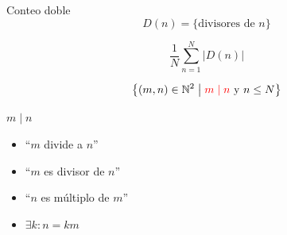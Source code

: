 \begin{frame}{Conteo doble}
  \[
    D(n) = \{\text{divisores de } n\}
  \]

  \[
    \frac{1}{N} \sum_{n=1}^{N} |D(n)|
  \]

  \[
    \left\{
      (m, n) \in \mathbb{N}^2 \;\middle|\;
      \textcolor{red}{m \mid n}
      \text{ y }
      n \leq N
    \right\}
  \]

  \begin{block}{$m \mid n$}
    \begin{itemize}
      \item ``$m$ divide a $n$''
      \item ``$m$ es divisor de $n$''
      \item ``$n$ es múltiplo de $m$''
      \item $\exists k : n = k m$
    \end{itemize}
  \end{block}
\end{frame}
